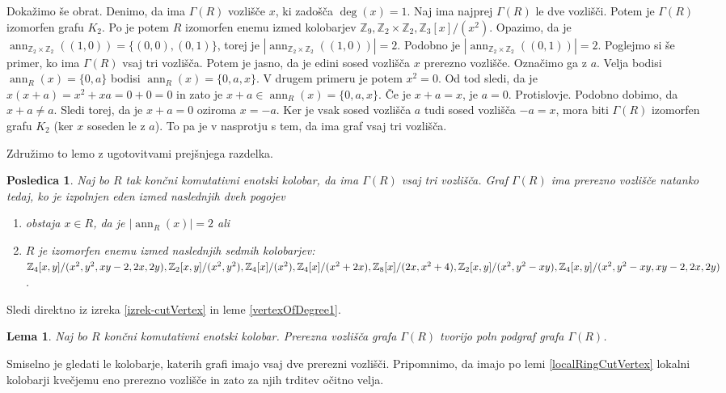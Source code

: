 \documentclass[a4paper, 12pt]{amsart}
\theoremstyle{definition} %
\theoremstyle{plain} %
\newtheorem{lema}[definicija]{Lema}
\newtheorem{posledica}[definicija]{Posledica}
\newcommand{\Z}{\mathbb Z}
\DeclareMathOperator{\ann}{ann}
\begin{document}
Dokažimo še obrat. Denimo, da ima $\Gamma(R)$ vozlišče $x$, ki zadošča $\deg(x)=1$. Naj ima najprej $\Gamma(R)$ le dve vozlišči. Potem je $\Gamma(R)$ izomorfen grafu $K_2$. Po \cite{Anderson-klasifikacijaMalihGrafov} je potem $R$ izomorfen enemu izmed kolobarjev $\Z_9, \Z_2 \times \Z_2, \Z_3[x]/(x^2)$. Opazimo, da je $\ann_{\Z_2 \times \Z_2}((1,0)) = \{(0,0), (0,1)\}$, torej je $|\ann_{\Z_2 \times \Z_2}((1,0))| = 2$. Podobno je $|\ann_{\Z_2 \times \Z_2}((0,1))| = 2$. 
Poglejmo si še primer, ko ima $\Gamma(R)$ vsaj tri vozlišča. Potem je jasno, da je edini sosed vozlišča $x$ prerezno vozlišče. Označimo ga z $a$. Velja bodisi $\ann_R(x) = \{0,a\}$ bodisi $\ann_R(x) = \{0,a,x\}$. V drugem primeru je potem $x^2 = 0$. Od tod sledi, da je $x(x+a) = x^2 + xa = 0 + 0 = 0$ in zato je $x+a \in \ann_R(x) = \{0,a,x\}$. Če je $x+a = x$, je $a=0$. Protislovje. Podobno dobimo, da $x+a\neq a$. Sledi torej, da je $x+a=0$ oziroma $x=-a$. Ker je vsak sosed vozlišča $a$ tudi sosed vozlišča $-a=x$, mora biti $\Gamma(R)$ izomorfen grafu $K_2$ (ker $x$ soseden le z $a$). To pa je v nasprotju s tem, da ima graf vsaj tri vozlišča.
\endproof

Združimo to lemo z ugotovitvami prejšnjega razdelka.

\begin{posledica}
Naj bo $R$ tak končni komutativni enotski kolobar, da ima $\Gamma(R)$ vsaj tri vozlišča. Graf $\Gamma(R)$ ima prerezno vozlišče natanko tedaj, ko je izpolnjen eden izmed naslednjih dveh pogojev
\begin{enumerate}
\item obstaja $x\in R$, da je $|\ann_R(x)| = 2$ ali
\item $R$ je izomorfen enemu izmed naslednjih sedmih kolobarjev: $\Z_4[x,y]/(x^2, y^2, \\xy-2,2x,2y), \Z_2[x,y]/(x^2,y^2), \Z_4[x]/(x^2),  \Z_4[x]/ (x^2+2x), \Z_8[x]/(2x,x^2 + 4), \Z_2[x,y]/(x^2, y^2 - xy), \Z_4[x,y]/(x^2, y^2 - xy, xy-2,2x,2y)$.
\end{enumerate}
\end{posledica}

\proof
Sledi direktno iz izreka \ref{izrek-cutVertex} in leme \ref{vertexOfDegree1}.
\endproof

\begin{lema}
Naj bo $R$ končni komutativni enotski kolobar. Prerezna vozlišča grafa $\Gamma(R)$ tvorijo poln podgraf grafa $\Gamma(R)$.
\end{lema}

\proof
Smiselno je gledati le kolobarje, katerih grafi imajo vsaj dve prerezni vozlišči. Pripomnimo, da imajo po lemi \ref{localRingCutVertex} lokalni kolobarji kvečjemu eno prerezno vozlišče in zato za njih trditev očitno velja.
\end{document}
